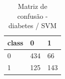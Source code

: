\begin{table}[htbp]
\centering
\begin{tabular}{lll}
\hline
class & 0 & 1 \\
\hline
0 & 434 & 66 \\
1 & 125 & 143 \\
\hline
\end{tabular}
\caption{Matriz de confusão - diabetes / SVM}
\label{tab:ex3-diabetes-svm-cm}
\end{table}